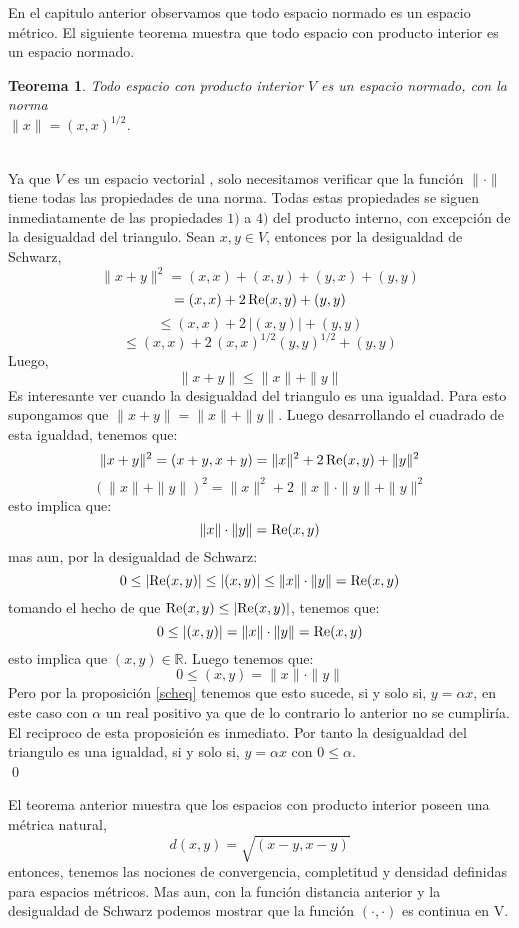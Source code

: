 \documentclass[12pt]{book}
\numberwithin{equation}{chapter}
\newtheorem{theorem}{Teorema}[chapter]
\def\n{\noindent}
\def\R{\mathbb{R}}
\begin{document}
En el capitulo anterior observamos que todo espacio normado es un espacio m\'etrico. El siguiente teorema muestra que todo espacio con producto interior es un espacio normado.

\newpage

\begin{theorem}\label{pi-nor}
Todo espacio con producto interior $V$ es un espacio normado, con la norma\\ $\|x\|= (x,x)^{1/2}$.
\end{theorem}
\n {\bf Demostraci\'on}\\
Ya que $V$ es un espacio vectorial , solo necesitamos verificar que la funci\'on $\|\cdot \|$ tiene todas las propiedades de una norma. Todas estas propiedades se siguen inmediatamente de las propiedades $1)$ a $4)$ del producto interno, con excepci\'on de la desigualdad del triangulo. Sean $x,y \in V$, entonces por la desigualdad de Schwarz,
$$ \|x+y\|^{2}= (x,x)+(x,y)+(y,x)+(y,y) $$  
$$ = (x,x) + 2\, \hbox{Re}(x,y) +(y,y) $$
$$ \leq (x,x) + 2\, |(x,y)| +(y,y) $$
$$ \leq (x,x) + 2\,(x,x)^{1/2}(y,y)^{1/2}+(y,y) $$
Luego,
$$ \|x+y\| \leq  \|x\| + \|y\|  $$
Es interesante ver cuando la desigualdad del triangulo es una igualdad. Para esto supongamos que $ \|x+y\|= \|x\|+\|y\| $. Luego desarrollando el cuadrado de esta igualdad, tenemos que:
$$ \| x+y \|^{2}= (x+y,x+y)= \|x\|^{2} + 2\, \hbox{Re}(x,y) + \|y\|^{2} $$
$$( \|x\|+ \|y\| )^{2}= \|x\|^{2} + 2\, \|x\|\cdot \|y\| + \|y\|^{2} $$
esto implica que:
$$ \|x\| \cdot \|y\|= \hbox{Re}(x,y) $$
mas aun, por la desigualdad de Schwarz:
$$0 \leq |\hbox{Re}(x,y)| \leq |(x,y)|\leq \|x\| \cdot \|y\| = \hbox{Re}(x,y) $$
tomando el hecho de que $\hbox{Re}(x,y) \leq |\hbox{Re}(x,y)|$, tenemos que:
$$0 \leq |(x,y)|= \|x\|\cdot \|y\| =\hbox{Re}(x,y) $$
esto implica que $(x,y) \in \R$. Luego tenemos que:
$$ 0 \leq (x,y) = \|x\| \cdot \|y\| $$
Pero por la proposici\'on \ref{scheq} tenemos que esto sucede, si y solo si, $y = \alpha x$, en este caso con $\alpha$ un real positivo ya que de lo contrario lo anterior no se cumplir\'ia. El reciproco de esta proposici\'on es inmediato. Por tanto la desigualdad del triangulo es una igualdad, si y solo si, $y=\alpha x$ con $0\leq \alpha$. \\ \qed

\vspace{5 mm}

El teorema anterior muestra que los espacios con producto interior poseen una m\'etrica natural,
$$ d(x,y)= \sqrt{ (x-y,x-y) } $$
entonces, tenemos las nociones de convergencia, completitud y densidad definidas para espacios m\'etricos. Mas aun, con la funci\'on distancia anterior y la desigualdad de Schwarz podemos mostrar que la funci\'on $(\cdot ,\cdot)$ es continua en V.
\end{document}
